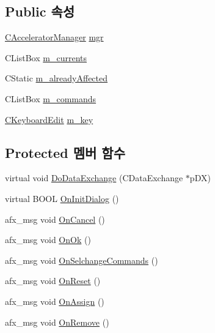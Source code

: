 \subsection*{Public 속성}
\begin{DoxyCompactItemize}
\item 
\mbox{\hyperlink{class_c_accelerator_manager}{C\+Accelerator\+Manager}} \mbox{\hyperlink{class_accel_editor_acb731e2193cb5022a95e83122651f96d}{mgr}}
\item 
C\+List\+Box \mbox{\hyperlink{class_accel_editor_a31909da8a929ef7b5e22ffbf64f1c68c}{m\+\_\+currents}}
\item 
C\+Static \mbox{\hyperlink{class_accel_editor_ac3d2378be850611ee51689bd34475275}{m\+\_\+already\+Affected}}
\item 
C\+List\+Box \mbox{\hyperlink{class_accel_editor_aba4ea3d3eced08de9fe39e307b5f40fc}{m\+\_\+commands}}
\item 
\mbox{\hyperlink{class_c_keyboard_edit}{C\+Keyboard\+Edit}} \mbox{\hyperlink{class_accel_editor_af0875f914fdddf5233a951cabd499a4d}{m\+\_\+key}}
\end{DoxyCompactItemize}
\subsection*{Protected 멤버 함수}
\begin{DoxyCompactItemize}
\item 
virtual void \mbox{\hyperlink{class_accel_editor_a3212b434e8c489ba308fa6a474dd32e7}{Do\+Data\+Exchange}} (C\+Data\+Exchange $\ast$p\+DX)
\item 
virtual B\+O\+OL \mbox{\hyperlink{class_accel_editor_a131b32f139220aadd5e36b4ddeb8cd58}{On\+Init\+Dialog}} ()
\item 
afx\+\_\+msg void \mbox{\hyperlink{class_accel_editor_a50b1043d4af01df3925f193b7755c05e}{On\+Cancel}} ()
\item 
afx\+\_\+msg void \mbox{\hyperlink{class_accel_editor_a3afd18b4482500a4ea29ee5d0d43cffc}{On\+Ok}} ()
\item 
afx\+\_\+msg void \mbox{\hyperlink{class_accel_editor_a16cb5c73f55199115c5a4f35268ff3fa}{On\+Selchange\+Commands}} ()
\item 
afx\+\_\+msg void \mbox{\hyperlink{class_accel_editor_a1afed0a04125915ae1517e1b08879b8b}{On\+Reset}} ()
\item 
afx\+\_\+msg void \mbox{\hyperlink{class_accel_editor_ad33ae69dcc262dd73595cb33d82c209e}{On\+Assign}} ()
\item 
afx\+\_\+msg void \mbox{\hyperlink{class_accel_editor_a40b74b67b95694245502b15ceedd278c}{On\+Remove}} ()
\end{DoxyCompactItemize}


